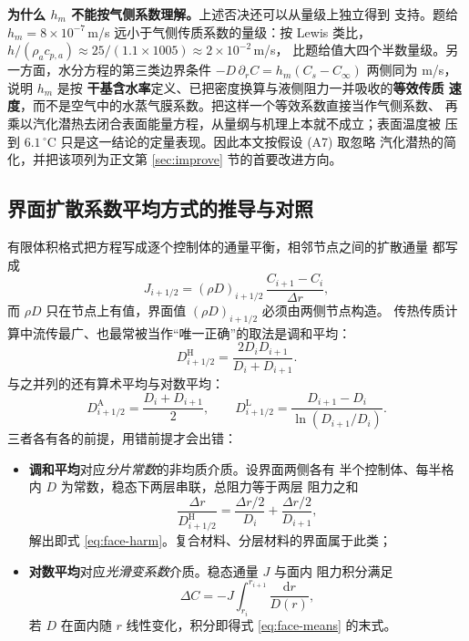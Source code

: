 \documentclass[12pt,a4paper,fontset=none]{ctexart}
\begin{document}
\textbf{为什么 $h_m$ 不能按气侧系数理解。}上述否决还可以从量级上独立得到
支持。题给 $h_m=8\times10^{-7}$\,m/s 远小于气侧传质系数的量级：按 Lewis
类比，$h/(\rho_a c_{p,a})\approx25/(1.1\times1005)\approx2\times10^{-2}$\,m/s，
比题给值大四个半数量级。另一方面，水分方程的第三类边界条件
$-D\,\partial_rC=h_m(C_s-C_\infty)$ 两侧同为 m/s，说明 $h_m$ 是按
\textbf{干基含水率}定义、已把密度换算与液侧阻力一并吸收的\textbf{等效传质
速度}，而不是空气中的水蒸气膜系数。把这样一个等效系数直接当作气侧系数、
再乘以汽化潜热去闭合表面能量方程，从量纲与机理上本就不成立；表面温度被
压到 $6.1\,^\circ$C 只是这一结论的定量表现。因此本文按假设 (A7) 取忽略
汽化潜热的简化，并把该项列为正文第 \ref{sec:improve} 节的首要改进方向。

\subsection{界面扩散系数平均方式的推导与对照}
\label{app:face}

有限体积格式把方程写成逐个控制体的通量平衡，相邻节点之间的扩散通量
都写成
\begin{equation}
  J_{i+1/2}=(\rho D)_{i+1/2}\,\frac{C_{i+1}-C_i}{\Delta r},
  \label{eq:face-flux}
\end{equation}
而 $\rho D$ 只在节点上有值，界面值 $(\rho D)_{i+1/2}$ 必须由两侧节点构造。
传热传质计算中流传最广、也最常被当作“唯一正确”的取法是调和平均：
\begin{equation}
  D^{\mathrm H}_{i+1/2}=\frac{2D_iD_{i+1}}{D_i+D_{i+1}} .
  \label{eq:face-harm}
\end{equation}
与之并列的还有算术平均与对数平均：
\begin{equation}
  D^{\mathrm A}_{i+1/2}=\frac{D_i+D_{i+1}}{2},\qquad
  D^{\mathrm L}_{i+1/2}=\frac{D_{i+1}-D_i}{\ln(D_{i+1}/D_i)} .
  \label{eq:face-means}
\end{equation}
三者各有各的前提，用错前提才会出错：

\begin{itemize}
  \item \textbf{调和平均}对应\emph{分片常数}的非均质介质。设界面两侧各有
        半个控制体、每半格内 $D$ 为常数，稳态下两层串联，总阻力等于两层
        阻力之和
        \begin{equation}
          \frac{\Delta r}{D^{\mathrm H}_{i+1/2}}
          =\frac{\Delta r/2}{D_i}+\frac{\Delta r/2}{D_{i+1}},
          \label{eq:face-series}
        \end{equation}
        解出即式 \eqref{eq:face-harm}。复合材料、分层材料的界面属于此类；
  \item \textbf{对数平均}对应\emph{光滑变系数}介质。稳态通量 $J$ 与面内
        阻力积分满足
        \begin{equation}
          \Delta C=-J\int_{r_i}^{r_{i+1}}\frac{\mathrm{d}r}{D(r)},
          \label{eq:face-resist}
        \end{equation}
        若 $D$ 在面内随 $r$ 线性变化，积分即得式 \eqref{eq:face-means}
        的末式。
\end{itemize}
\end{document}
